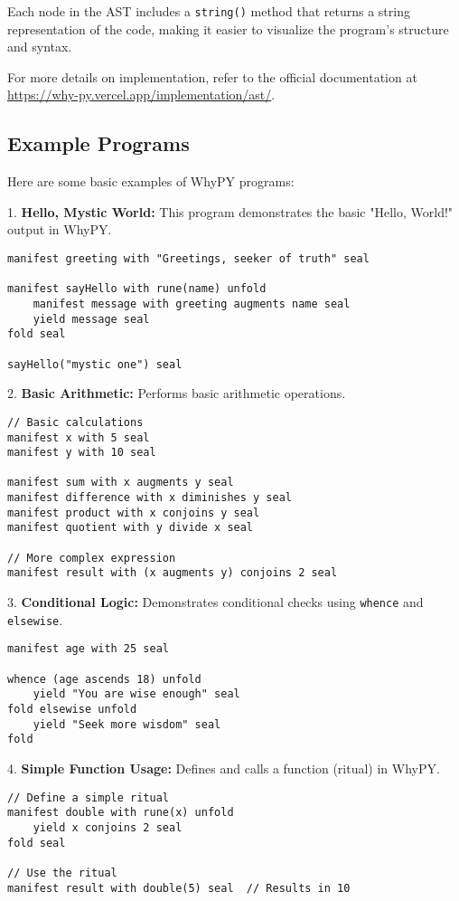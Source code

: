 \documentclass[conference]{IEEEtran}
\begin{document}
Each node in the AST includes a \texttt{string()} method that returns a string representation of the code, making it easier to visualize the program’s structure and syntax.

For more details on implementation, refer to the official documentation at \url{https://why-py.vercel.app/implementation/ast/}.


\subsection{Example Programs}

Here are some basic examples of WhyPY programs:

1. \textbf{Hello, Mystic World:}
   This program demonstrates the basic "Hello, World!" output in WhyPY.
   \begin{lstlisting}
manifest greeting with "Greetings, seeker of truth" seal

manifest sayHello with rune(name) unfold
    manifest message with greeting augments name seal
    yield message seal
fold seal

sayHello("mystic one") seal
   \end{lstlisting}

2. \textbf{Basic Arithmetic: }
   Performs basic arithmetic operations.
   \begin{lstlisting}
// Basic calculations
manifest x with 5 seal
manifest y with 10 seal

manifest sum with x augments y seal
manifest difference with x diminishes y seal
manifest product with x conjoins y seal
manifest quotient with y divide x seal

// More complex expression
manifest result with (x augments y) conjoins 2 seal
   \end{lstlisting}

3. \textbf{Conditional Logic: }
   Demonstrates conditional checks using \texttt{whence} and \texttt{elsewise}.
   \begin{lstlisting}
manifest age with 25 seal

whence (age ascends 18) unfold
    yield "You are wise enough" seal
fold elsewise unfold
    yield "Seek more wisdom" seal
fold
   \end{lstlisting}

4. \textbf{Simple Function Usage: }
   Defines and calls a function (ritual) in WhyPY.
   \begin{lstlisting}
// Define a simple ritual
manifest double with rune(x) unfold
    yield x conjoins 2 seal
fold seal

// Use the ritual
manifest result with double(5) seal  // Results in 10
   \end{lstlisting}
\end{document}
